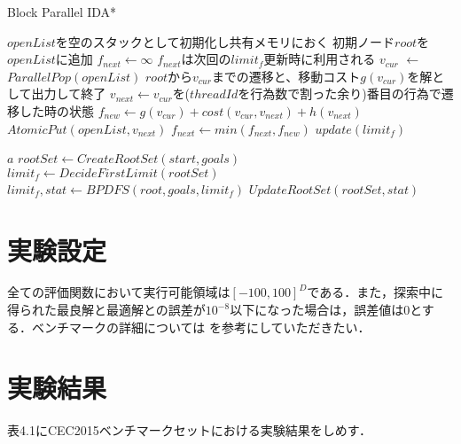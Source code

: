 \documentclass[a4paper,11pt,oneside,openany]{jsbook}
\begin{document}
\newpage
\begin{algorithm}
\caption{Block Parallel IDA*}
\label{alg:pbnf}
\begin{algorithmic}[1]
    \State $openList$を空のスタックとして初期化し共有メモリにおく
    \State 初期ノード$root$を$openList$に追加
    \State $f_{next} \leftarrow \infty$
    \State $f_{next}$は次回の$limit_f$更新時に利用される 
        \State $v_{cur}$ $\leftarrow$ ${ParallelPop}(openList)$
            \State $root$から$v_{cur}$までの遷移と、移動コスト$g(v_{cur})$を解として出力して終了
        \EndIf
        \State $v_{next} \gets $$v_{cur}$を($threadId$を行為数で割った余り)番目の行為で遷移した時の状態
        \State $f_{new} \leftarrow g(v_{cur}) + cost(v_{cur}, v_{next}) + h(v_{next})$
            \State ${AtomicPut}(openList, v_{next})$ 
        \Else
            \State $f_{next} \leftarrow min(f_{next}, f_{new})$
        \EndIf
    \EndWhile
    \State $update(limit_f)$

    \State \Return $a$
\EndFunction
{}
    \State $rootSet \gets {CreateRootSet}(start, goals)$
    \State $limit_f \leftarrow {DecideFirstLimit}(rootSet)$
            \State $limit_f, stat \gets {BPDFS}(root, goals, limit_f)$
        \EndParallelForByBlocks
        \State $UpdateRootSet(rootSet, stat)$
    \EndWhile
\EndFunction

\end{algorithmic}
\end{algorithm}
\newpage



\section{実験設定}
全ての評価関数において実行可能領域は$[-100,100]^D$である．また，探索中に得られた最良解と最適解との誤差が$10^{-8}$以下になった場合は，誤差値は0とする．ベンチマークの詳細については \cite{CEC2015} を参考にしていただきたい．

\section{実験結果}
表4.1にCEC2015ベンチマークセットにおける実験結果をしめす．
\end{document}
